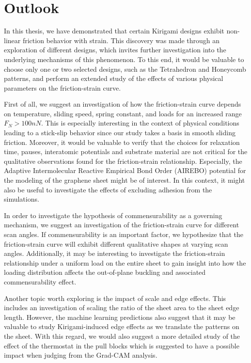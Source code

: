 \section{Outlook}
In this thesis, we have demonstrated that certain Kirigami designs exhibit non-linear friction behavior with strain. This discovery was made through an exploration of different designs, which invites further investigation into the underlying mechanisms of this phenomenon. To this end, it would be valuable to choose only one or two selected designs, such as the Tetrahedron and Honeycomb patterns, and perform an extended study of the effects of various physical parameters on the friction-strain curve.

First of all, we suggest an investigation of how the friction-strain curve
depends on temperature, sliding speed, spring constant, and loads for an
increased range $F_N > 100 nN$. This is especially interesting in the context of
physical conditions leading to a stick-slip behavior since our study takes a
basis in smooth sliding friction. Moreover, it would be valuable to verify that
the choices for relaxation time, pauses, interatomic potentials and substrate
material are not critical for the qualitative observations found for the
friction-strain relationship. Especially, the Adaptive Intermolecular Reactive
Empirical Bond Order (AIREBO) potential for the modeling of the graphene sheet
might be of interest. In this context, it might also be useful to investigate
the effects of excluding adhesion from the simulations. 

In order to investigate the hypothesis of commensurability as a governing
mechanism, we suggest an investigation of the friction-strain curve for different
scan angles. If commensurability is an important factor, we hypothesize that the friction-strain curve will exhibit different qualitative shapes at varying scan
angles. Additionally, it may be interesting to investigate the friction-strain
relationship under a uniform load on the entire sheet to gain insight into how the loading
distribution affects the out-of-plane buckling and associated commensurability
effect.

Another topic worth exploring is the impact of scale and edge effects. This includes an investigation of scaling the ratio of the sheet area to the sheet edge length. However, the machine learning predictions also suggest that it may be valuable to study Kirigami-induced edge effects as we translate the patterns on the sheet. With this regard, we would also suggest a more detailed study of the effect of the thermostat in the pull blocks which is suggested to have a possible impact when judging from the Grad-CAM analysis. 


